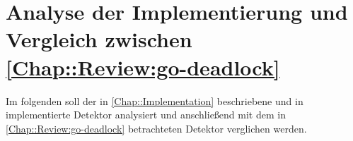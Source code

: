 \chapter{Analyse der Implementierung und Vergleich zwischen 
    \ref{Chap::Review:go-deadlock}}
Im folgenden soll der in \ref{Chap::Implementation} beschriebene und in 
\cite{implementation} implementierte Detektor analysiert und anschließend
mit dem in \ref{Chap::Review:go-deadlock} betrachteten Detektor verglichen
werden.